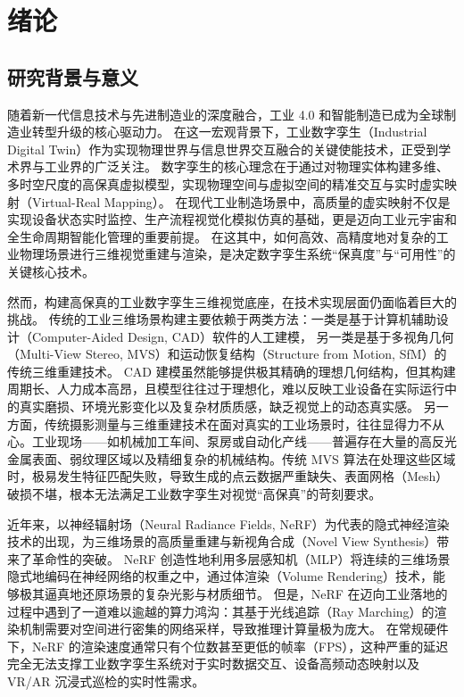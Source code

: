 \chapter{绪论}

\section{研究背景与意义}

随着新一代信息技术与先进制造业的深度融合，工业 4.0 和智能制造已成为全球制造业转型升级的核心驱动力。
在这一宏观背景下，工业数字孪生（Industrial Digital Twin）作为实现物理世界与信息世界交互融合的关键使能技术，正受到学术界与工业界的广泛关注。
数字孪生的核心理念在于通过对物理实体构建多维、多时空尺度的高保真虚拟模型，实现物理空间与虚拟空间的精准交互与实时虚实映射（Virtual-Real Mapping）。
在现代工业制造场景中，高质量的虚实映射不仅是实现设备状态实时监控、生产流程视觉化模拟仿真的基础，更是迈向工业元宇宙和全生命周期智能化管理的重要前提。
在这其中，如何高效、高精度地对复杂的工业物理场景进行三维视觉重建与渲染，是决定数字孪生系统“保真度”与“可用性”的关键核心技术。

然而，构建高保真的工业数字孪生三维视觉底座，在技术实现层面仍面临着巨大的挑战。
传统的工业三维场景构建主要依赖于两类方法：一类是基于计算机辅助设计（Computer-Aided Design, CAD）软件的人工建模，
另一类是基于多视角几何（Multi-View Stereo, MVS）和运动恢复结构（Structure from Motion, SfM）的传统三维重建技术。
CAD 建模虽然能够提供极其精确的理想几何结构，但其构建周期长、人力成本高昂，且模型往往过于理想化，难以反映工业设备在实际运行中的真实磨损、环境光影变化以及复杂材质质感，缺乏视觉上的动态真实感。
另一方面，传统摄影测量与三维重建技术在面对真实的工业场景时，往往显得力不从心。工业现场——如机械加工车间、泵房或自动化产线——普遍存在大量的高反光金属表面、弱纹理区域以及精细复杂的机械结构。传统 MVS 算法在处理这些区域时，极易发生特征匹配失败，导致生成的点云数据严重缺失、表面网格（Mesh）破损不堪，根本无法满足工业数字孪生对视觉“高保真”的苛刻要求。

近年来，以神经辐射场（Neural Radiance Fields, NeRF）为代表的隐式神经渲染技术的出现，为三维场景的高质量重建与新视角合成（Novel View Synthesis）带来了革命性的突破。
NeRF 创造性地利用多层感知机（MLP）将连续的三维场景隐式地编码在神经网络的权重之中，通过体渲染（Volume Rendering）技术，能够极其逼真地还原场景的复杂光影与材质细节。
但是，NeRF 在迈向工业落地的过程中遇到了一道难以逾越的算力鸿沟：其基于光线追踪（Ray Marching）的渲染机制需要对空间进行密集的网络采样，导致推理计算量极为庞大。
在常规硬件下，NeRF 的渲染速度通常只有个位数甚至更低的帧率（FPS），这种严重的延迟完全无法支撑工业数字孪生系统对于实时数据交互、设备高频动态映射以及 VR/AR 沉浸式巡检的实时性需求。

